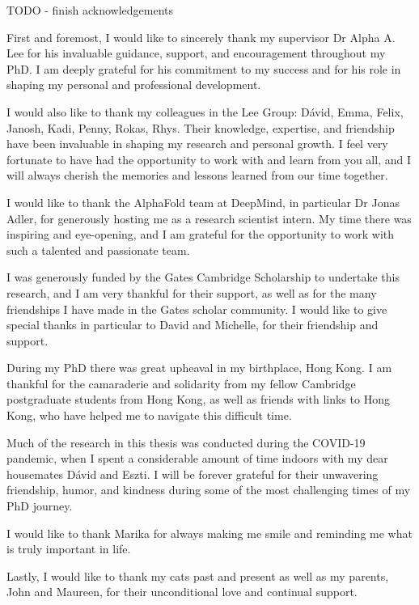 
\begin{acknowledgements}

TODO - finish acknowledgements

First and foremost, I would like to sincerely thank my supervisor Dr Alpha A. Lee for his invaluable guidance, support, and encouragement throughout my PhD. I am deeply grateful for his commitment to my success and for his role in shaping my personal and professional development.

I would also like to thank my colleagues in the Lee Group: Dávid, Emma, Felix, Janosh, Kadi, Penny, Rokas, Rhys. Their knowledge, expertise, and friendship have been invaluable in shaping my research and personal growth. I feel very fortunate to have had the opportunity to work with and learn from you all, and I will always cherish the memories and lessons learned from our time together.

I would like to thank the AlphaFold team at DeepMind, in particular Dr Jonas Adler, for generously hosting me as a research scientist intern. My time there was inspiring and eye-opening, and I am grateful for the opportunity to work with such a talented and passionate team.

I was generously funded by the Gates Cambridge Scholarship to undertake this research, and I am very thankful for their support, as well as for the many friendships I have made in the Gates scholar community. I would like to give special thanks in particular to David and Michelle, for their friendship and support.

During my PhD there was great upheaval in my birthplace, Hong Kong. I am thankful for the camaraderie and solidarity from my fellow Cambridge postgraduate students from Hong Kong, as well as friends with links to Hong Kong, who have helped me to navigate this difficult time.

Much of the research in this thesis was conducted during the COVID-19 pandemic, when I spent a considerable amount of time indoors with my dear housemates Dávid and Eszti. I will be forever grateful for their unwavering friendship, humor, and kindness during some of the most challenging times of my PhD journey.

I would like to thank Marika for always making me smile and reminding me what is truly important in life.

Lastly, I would like to thank my cats past and present as well as my parents, John and Maureen, for their unconditional love and continual support.

\end{acknowledgements}
